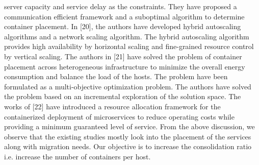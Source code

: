 \documentclass[conference]{IEEEtran}
\begin{document}
server capacity and service delay as the constraints. They
have proposed a communication efficient framework and a
suboptimal algorithm to determine container placement. In
[20], the authors have developed hybrid autoscaling algorithms
and a network scaling algorithm. The hybrid autoscaling
algorithm provides high availability by horizontal scaling and
fine-grained resource control by vertical scaling. The authors
in [21] have solved the problem of container placement across
heterogeneous infrastructure to minimize the overall energy
consumption and balance the load of the hosts. The problem have been formulated as a multi-objective optimization
problem. The authors have solved the problem based on an
incremental exploration of the solution space. The works of
[22] have introduced a resource allocation framework for the
containerized deployment of microservices to reduce operating
costs while providing a minimum guaranteed level of service.
From the above discussion, we observe that the existing
studies mostly look into the placement of the services along
with migration needs. Our objective is to increase the consolidation ratio i.e. increase the number of containers per host.
\end{document}
